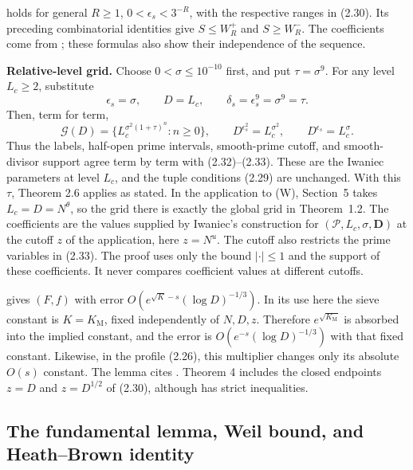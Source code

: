 \cite[Theorem~4]{AA37} holds for general $R\geq1$, $0<\epsilon_s<3^{-R}$, with the respective ranges in (2.30). Its preceding combinatorial identities give $S\leq W_R^+$ and $S\geq W_R^-$. The coefficients come from \cite[(23)--(25), (26), and Lemma~4]{AA37}; these formulas also show their independence of the sequence.

\textbf{Relative-level grid.} Choose $0<\sigma\leq10^{-10}$ first, and put $\tau=\sigma^9$. For any level $L_c\ge2$, substitute
\[
 \epsilon_s=\sigma,\qquad D=L_c,\qquad
 \delta_s=\epsilon_s^9=\sigma^9=\tau.
\tag{2.33a}\label{p1:eq:2.33a}
\]
Then, term for term,
\[
 \mathcal G(D)
 =\{L_c^{\sigma^2(1+\tau)^n}:n\geq0\},\qquad
 D^{\epsilon_s^2}=L_c^{\sigma^2},\qquad
 D^{\epsilon_s}=L_c^\sigma.
\tag{2.33b}\label{p1:eq:2.33b}
\]
Thus the labels, half-open prime intervals, smooth-prime cutoff, and smooth-divisor support agree term by term with (2.32)--(2.33). These are the Iwaniec parameters at level $L_c$, and the tuple conditions (2.29) are unchanged. With this $\tau$, Theorem 2.6 applies as stated. In the application to (W), Section~5 takes $L_c=D=N^\theta$, so the grid there is exactly the global grid in Theorem~1.2. The coefficients are the values supplied by Iwaniec's construction for $(\mathcal P,L_c,\sigma,\mathbf D)$ at the cutoff $z$ of the application, here $z=N^u$. The cutoff also restricts the prime variables in (2.33). The proof uses only the bound $|\cdot|\le1$ and the support of these coefficients. It never compares coefficient values at different cutoffs.

\cite[Lemma~3]{AA37} gives $(F,f)$ with error
$O(e^{\sqrt K-s}(\log D)^{-1/3})$. In its use here the sieve
constant is $K=K_{\mathrm M}$, fixed independently of $N,D,z$.
Therefore $e^{\sqrt{K_{\mathrm M}}}$ is absorbed into the implied
constant, and the error is $O(e^{-s}(\log D)^{-1/3})$ with that fixed
constant. Likewise, in the profile (2.26), this multiplier changes only
its absolute $O(s)$ constant. The lemma cites
\cite[Lemmas~18 and 20]{AA36}. Theorem 4 includes the
closed endpoints $z=D$ and $z=D^{1/2}$ of (2.30), although
\cite[Lemma~20]{AA36} has strict inequalities.

\subsection{The fundamental lemma, Weil bound, and Heath--Brown identity}

